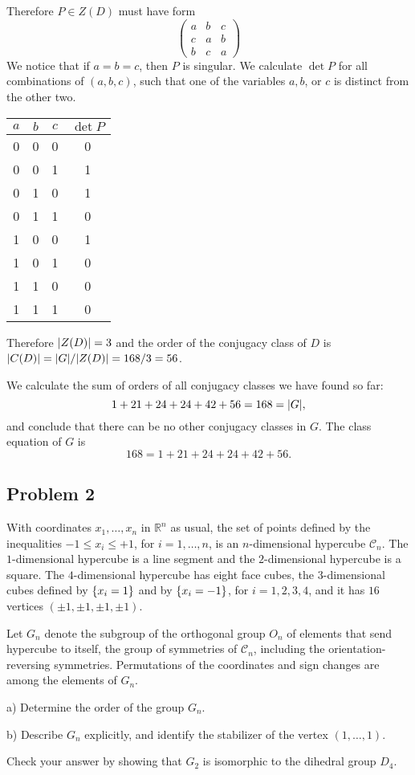 \documentclass{article}
\theoremstyle{definition}
\newcommand{\R}{\mathbb{R}}
\DeclarePairedDelimiter\set{\{}{\}}
\DeclarePairedDelimiter\abs{\lvert}{\rvert}
\begin{document}
Therefore $P \in Z(D)$ must have form
\[
    \begin{pmatrix}
        a & b & c \\
        c & a & b \\
        b & c & a
    \end{pmatrix}
\]
We notice that if $a = b = c$, then $P$ is singular.
We calculate $\det P$ for all combinations of $(a,b,c)$, such that one of the variables $a,b$, or $c$ is distinct from the other two.
\begin{center}
    \begin{tabular}{ c c c | c }
        $a$ & $b$ & $c$ & $\det P$ \\
        \hline
        0 & 0 & 0 & 0 \\
        0 & 0 & 1 & 1 \\
        0 & 1 & 0 & 1 \\
        0 & 1 & 1 & 0 \\
        1 & 0 & 0 & 1 \\
        1 & 0 & 1 & 0 \\
        1 & 1 & 0 & 0 \\
        1 & 1 & 1 & 0 \\
     \end{tabular}
\end{center}
Therefore $\abs{Z(D)} = 3$ and the order of the conjugacy class of $D$ is $\abs{C(D)} = \abs{G} / \abs{Z(D)} = 168 / 3 = 56$.

We calculate the sum of orders of all conjugacy classes we have found so far:
\[ 1 + 21 + 24 + 24 + 42 + 56 = 168 = \abs{G}, \]
and conclude that there can be no other conjugacy classes in $G$.
The class equation of $G$ is
\[ 168 = 1 + 21 + 24 + 24 + 42 + 56. \]


\subsection*{Problem 2}

\begin{tcolorbox}
With coordinates $x_1, \dots, x_n$ in $\R^n$ as usual, the set of points defined by the inequalities $-1 \leq x_i \leq +1$, for $i = 1, \dots, n$, is an $n$-dimensional hypercube $\mathcal{C}_n$.
The $1$-dimensional hypercube is a line segment and the $2$-dimensional hypercube is a square.
The $4$-dimensional hypercube has eight face cubes, the $3$-dimensional cubes defined by $\set{x_i=1}$ and by $\set{x_i=-1}$, for $i=1,2,3,4$, and it has $16$ vertices $(\pm 1, \pm 1, \pm 1, \pm 1)$.

Let $G_n$ denote the subgroup of the orthogonal group $O_n$ of elements that send hypercube to itself, the group of symmetries of $\mathcal{C}_n$, including the orientation-reversing symmetries.
Permutations of the coordinates and sign changes are among the elements of $G_n$.

a) Determine the order of the group $G_n$.

b) Describe $G_n$ explicitly, and identify the stabilizer of the vertex $(1, \dots, 1)$.

Check your answer by showing that $G_2$ is isomorphic to the dihedral group $D_4$.
\end{tcolorbox}
\end{document}
